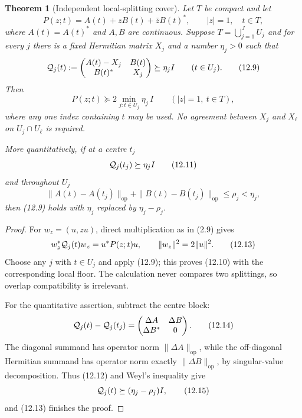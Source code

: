\documentclass[11pt,oneside]{article}
\newtheorem{theorem}{Theorem}[section]
\theoremstyle{definition}
\theoremstyle{remark}
\begin{document}
\begin{theorem}[Independent local-splitting cover]
\label{thm:newv12-independent-cover}
Let \(T\) be compact and let
\[
 P(z;t)=A(t)+zB(t)+\bar zB(t)^*,\qquad |z|=1,\quad t\in T, \tag{12.8}
\]
where \(A(t)=A(t)^*\) and \(A,B\) are continuous.  Suppose
\(T=\bigcup_{j=1}^J U_j\) and for every \(j\) there is a fixed
Hermitian matrix \(X_j\) and a number \(\eta_j>0\) such that
\[
 {\cal Q}_j(t):=
 \begin{pmatrix}
 A(t)-X_j&B(t)\\
 B(t)^*&X_j
 \end{pmatrix}
 \succeq\eta_j I
 \qquad(t\in U_j).                                       \tag{12.9}
\]
Then
\[
 P(z;t)\succeq 2\min_{j:t\in U_j}\eta_j\,I
 \qquad(|z|=1,\ t\in T),                                 \tag{12.10}
\]
where any one index containing \(t\) may be used.  No agreement
between \(X_j\) and \(X_\ell\) on \(U_j\cap U_\ell\) is required.

More quantitatively, if at a centre \(t_j\)
\[
 {\cal Q}_j(t_j)\succeq\eta_jI                            \tag{12.11}
\]
and throughout \(U_j\)
\[
 \|A(t)-A(t_j)\|_{\mathrm{op}}
 +\|B(t)-B(t_j)\|_{\mathrm{op}}\le\rho_j<\eta_j,          \tag{12.12}
\]
then (12.9) holds with \(\eta_j\) replaced by
\(\eta_j-\rho_j\).
\end{theorem}

\begin{proof}
For \(w_z=(u,zu)\), direct multiplication as in (2.9) gives
\[
 w_z^*{\cal Q}_j(t)w_z=u^*P(z;t)u,\qquad
 \|w_z\|^2=2\|u\|^2.                                     \tag{12.13}
\]
Choose any \(j\) with \(t\in U_j\) and apply (12.9); this proves
(12.10) with the corresponding local floor.  The calculation never
compares two splittings, so overlap compatibility is irrelevant.

For the quantitative assertion, subtract the centre block:
\[
 {\cal Q}_j(t)-{\cal Q}_j(t_j)
 =
 \begin{pmatrix}
 \Delta A&\Delta B\\
 \Delta B^*&0
 \end{pmatrix}.                                          \tag{12.14}
\]
The diagonal summand has operator norm
\(\|\Delta A\|_{\mathrm{op}}\), while the off-diagonal Hermitian
summand has operator norm exactly
\(\|\Delta B\|_{\mathrm{op}}\), by singular-value decomposition.
Thus (12.12) and Weyl's inequality give
\[
 {\cal Q}_j(t)\succeq(\eta_j-\rho_j)I,                   \tag{12.15}
\]
and (12.13) finishes the proof.
\end{proof}
\end{document}
